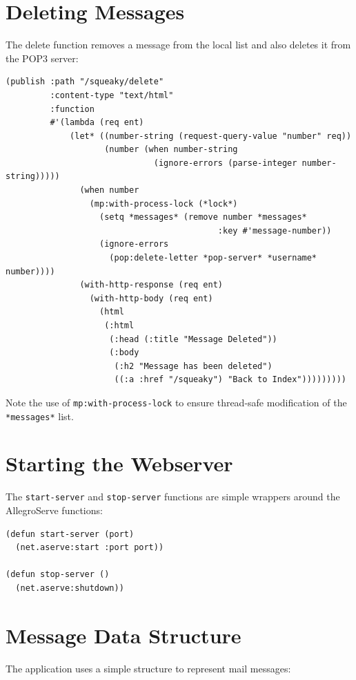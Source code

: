 \section{Deleting Messages}

The delete function removes a message from the local list and also deletes it from the POP3
server:

\begin{verbatim}
(publish :path "/squeaky/delete"
         :content-type "text/html"
         :function
         #'(lambda (req ent)
             (let* ((number-string (request-query-value "number" req))
                    (number (when number-string
                              (ignore-errors (parse-integer number-string)))))
               (when number
                 (mp:with-process-lock (*lock*)
                   (setq *messages* (remove number *messages*
                                           :key #'message-number))
                   (ignore-errors
                     (pop:delete-letter *pop-server* *username* number))))
               (with-http-response (req ent)
                 (with-http-body (req ent)
                   (html
                    (:html
                     (:head (:title "Message Deleted"))
                     (:body
                      (:h2 "Message has been deleted")
                      ((:a :href "/squeaky") "Back to Index")))))))))
\end{verbatim}

Note the use of \texttt{mp:with-process-lock} to ensure thread-safe modification of the \texttt{*messages*}
list.

\section{Starting the Webserver}

The \texttt{start-server} and \texttt{stop-server} functions are simple wrappers around the AllegroServe functions:

\begin{verbatim}
(defun start-server (port)
  (net.aserve:start :port port))

(defun stop-server ()
  (net.aserve:shutdown))
\end{verbatim}

\section{Message Data Structure}

The application uses a simple structure to represent mail messages:

